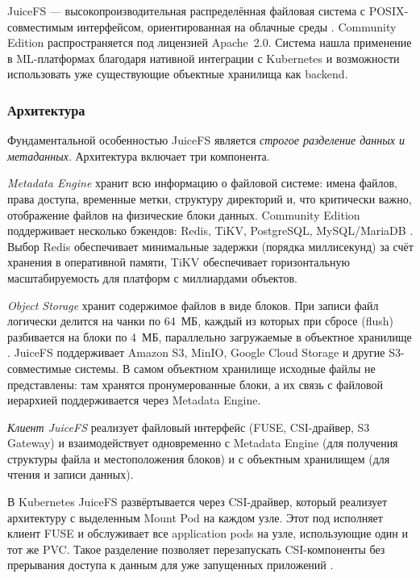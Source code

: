 JuiceFS --- высокопроизводительная распределённая файловая система с POSIX-совместимым интерфейсом, ориентированная на облачные среды \cite{juicefs_intro}. Community Edition распространяется под лицензией Apache~2.0. Система нашла применение в ML-платформах благодаря нативной интеграции с Kubernetes и возможности использовать уже существующие объектные хранилища как backend.

\subsubsection{Архитектура}

Фундаментальной особенностью JuiceFS является \textit{строгое разделение данных и метаданных}. Архитектура включает три компонента.

\textit{Metadata Engine} хранит всю информацию о файловой системе: имена файлов, права доступа, временные метки, структуру директорий и, что критически важно, отображение файлов на физические блоки данных. Community Edition поддерживает несколько бэкендов: Redis, TiKV, PostgreSQL, MySQL/MariaDB \cite{juicefs_design}. Выбор Redis обеспечивает минимальные задержки (порядка миллисекунд) за счёт хранения в оперативной памяти, TiKV обеспечивает горизонтальную масштабируемость для платформ с миллиардами объектов.

\textit{Object Storage} хранит содержимое файлов в виде блоков. При записи файл логически делится на чанки по 64~МБ, каждый из которых при сбросе (flush) разбивается на блоки по 4~МБ, параллельно загружаемые в объектное хранилище \cite{juicefs_design}. JuiceFS поддерживает Amazon S3, MinIO, Google Cloud Storage и другие S3-совместимые системы. В самом объектном хранилище исходные файлы не представлены: там хранятся пронумерованные блоки, а их связь с файловой иерархией поддерживается через Metadata Engine.

\textit{Клиент JuiceFS} реализует файловый интерфейс (FUSE, CSI-драйвер, S3 Gateway) и взаимодействует одновременно с Metadata Engine (для получения структуры файла и местоположения блоков) и с объектным хранилищем (для чтения и записи данных).

В Kubernetes JuiceFS развёртывается через CSI-драйвер, который реализует архитектуру с выделенным Mount Pod на каждом узле. Этот под исполняет клиент FUSE и обслуживает все application pods на узле, использующие один и тот же PVC. Такое разделение позволяет перезапускать CSI-компоненты без прерывания доступа к данным для уже запущенных приложений \cite{juicefs_perf}.

